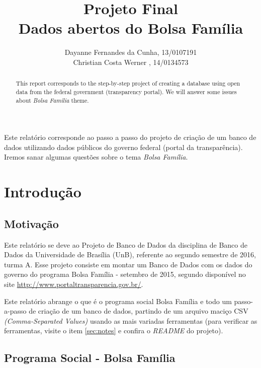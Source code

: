 \documentclass[12pt]{article}
\title{Projeto Final\\ 
	Dados abertos do Bolsa Família}
\author{Dayanne Fernandes da Cunha, 13/0107191\\
	 Christian Costa Werner ,  14/0134573
}
\begin{document}
 
	\maketitle
	
	\begin{abstract}
		This report corresponds to the step-by-step project of creating a database using open data from the federal government (transparency portal). We will answer some issues about \textit{Bolsa Familia} theme.
	\end{abstract}
	
	\begin{resumo} 
		Este relatório corresponde ao passo a passo do projeto de criação de um banco de dados utilizando dados públicos do governo federal (portal da transparência). Iremos sanar algumas questões sobre o tema \textit{Bolsa Família}.
	\end{resumo}
	
	\tableofcontents
	\newpage 
	
	\section{Introdução}
	\label{sec:intro}
	
	\subsection{Motivação}
	\label{sec:motiv}
	
	Este relatório se deve ao Projeto de Banco de Dados da disciplina de Banco de Dados da Universidade de Brasília (UnB), referente ao segundo semestre de 2016, turma A. Esse projeto consiste em montar um Banco de Dados com os dados do governo do programa Bolsa Família - setembro de 2015, segundo disponível no site \url{http://www.portaltransparencia.gov.br/}.
	
	Este relatório abrange o que é o programa social Bolsa Família e todo um passo-a-passo de criação de um banco de dados, partindo de um arquivo maciço CSV \emph{(Comma-Separated Values)} usando as mais variadas ferramentas (para verificar as ferramentas, visite o item \ref{sec:notes} e confira o \emph{README} do projeto).
	
	\subsection{Programa Social - Bolsa Família}
	\label{sec:psbf}
	
\end{document}
